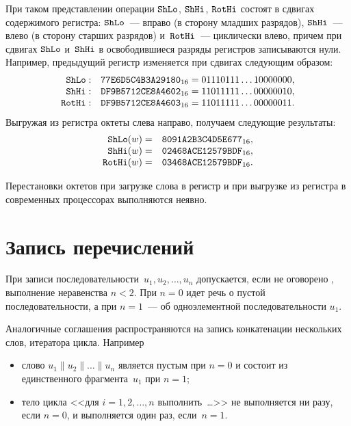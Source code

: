 При таком представлении операции $\mathop{\texttt{ShLo}}\nolimits$, $\mathop{\texttt{ShHi}}\nolimits$, $\mathop{\texttt{RotHi}}\nolimits$ состоят в
сдвигах содержимого регистра: 
$\mathop{\texttt{ShLo}}\nolimits$~--- вправо (в сторону младших разрядов),
$\mathop{\texttt{ShHi}}\nolimits$~--- влево (в сторону старших разрядов)
и~$\mathop{\texttt{RotHi}}\nolimits$~--- циклически влево,
причем при сдвигах $\mathop{\texttt{ShLo}}\nolimits$ и~$\mathop{\texttt{ShHi}}\nolimits$ в освободившиеся разряды 
регистров записываются нули.
%
Например, предыдущий регистр изменяется при сдвигах следующим образом:
$$      
\begin{array}{rl}
\mathop{\texttt{ShLo}}\nolimits: &\texttt{77E6D5C4B3A29180}_{16}
=0 1110111\ldots 1 0000000
,\\
\mathop{\texttt{ShHi}}\nolimits: &\texttt{DF9B5712CE8A4602}_{16}
=1101111 1 \ldots 0000001 0
,\\
\mathop{\texttt{RotHi}}\nolimits: &\texttt{DF9B5712CE8A4603}_{16}
=1101111 1\ldots 0000001 1
.
\end{array}
$$
Выгружая из регистра октеты слева направо, 
получаем следующие результаты:
$$
\begin{array}{rl}
\mathop{\texttt{ShLo}}\nolimits(w)=  &\texttt{8091A2B3C4D5E677}_{16},\\
\mathop{\texttt{ShHi}}\nolimits(w)=  &\texttt{02468ACE12579BDF}_{16},\\
\mathop{\texttt{RotHi}}\nolimits(w)= &\texttt{03468ACE12579BDF}_{16}.
\end{array}
$$

Перестановки октетов при загрузке слова в регистр и при выгрузке из 
регистра в современных процессорах выполняются неявно.

\section{Запись перечислений}\label{DEFS.Seqs}

При записи последовательности~$u_1,u_2,\ldots,u_n$ 
допускается, если не оговорено , выполнение неравенства $n<2$.
При $n=0$ идет речь о пустой последовательности, 
а при $n=1$~--- об одноэлементной последовательности $u_1$.

Аналогичные соглашения распространяются на запись конкатенации нескольких 
слов, итератора цикла.
%
Например\addendum{:}
\begin{itemize}
\item
слово $u_1\parallel u_2\parallel\ldots\parallel u_n$ является пустым при $n=0$ 
и состоит из единственного фрагмента~$u_1$ при $n=1$;
\item
тело цикла <<для $i=1,2,\ldots,n$ выполнить~\ldots>>
не выполняется ни разу, если $n=0$, и выполняется один раз, если~$n=1$.
\end{itemize}
